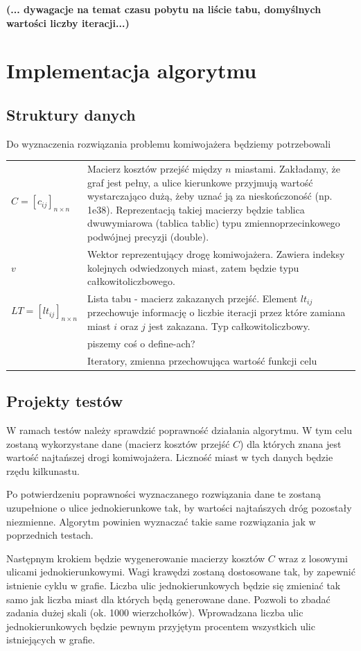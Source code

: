 \documentclass[11pt,a4paper,twoside]{article}
\begin{document}
\textbf{(... dywagacje na temat czasu pobytu na liście tabu, domyślnych wartości liczby iteracji...)}

\section{Implementacja algorytmu}

\subsection{Struktury danych}
Do wyznaczenia rozwiązania problemu komiwojażera będziemy potrzebowali
\bgroup
\def\arraystretch{1.5}
\begin{tabularx}{\textwidth}{l|X}
$C = [c_{ij}]_{n\times n}$ & Macierz kosztów przejść między $n$ miastami. Zakładamy, że graf jest pełny, a ulice kierunkowe przyjmują wartość wystarczająco dużą, żeby uznać ją za nieskończoność (np. 1e38). Reprezentacją takiej macierzy będzie tablica dwuwymiarowa (tablica tablic) typu zmiennoprzecinkowego podwójnej precyzji (double).\\
$v$ & Wektor reprezentujący drogę komiwojażera. Zawiera indeksy kolejnych odwiedzonych miast, zatem będzie typu całkowitoliczbowego. \\
$LT = [lt_{ij}]_{n\times n}$ & Lista tabu - macierz zakazanych przejść. Element $lt_{ij}$ przechowuje informację o liczbie iteracji przez które zamiana miast $i$ oraz $j$ jest zakazana. Typ całkowitoliczbowy.\\
 & piszemy coś o define-ach?\\
 & Iteratory, zmienna przechowująca wartość funkcji celu\\
\end{tabularx}
\egroup
\subsection{Projekty testów}
W ramach testów należy sprawdzić poprawność działania algorytmu. W tym celu zostaną wykorzystane dane (macierz kosztów przejść $C$) dla których znana jest wartość najtańszej drogi komiwojażera. Liczność miast w tych danych będzie rzędu kilkunastu.

Po potwierdzeniu poprawności wyznaczanego rozwiązania dane te zostaną uzupełnione o ulice jednokierunkowe tak, by wartości najtańszych dróg pozostały niezmienne. Algorytm powinien wyznaczać takie same rozwiązania jak w poprzednich testach.

Następnym krokiem będzie wygenerowanie macierzy kosztów $C$ wraz z losowymi ulicami jednokierunkowymi. Wagi krawędzi zostaną dostosowane tak, by zapewnić istnienie cyklu w grafie. Liczba ulic jednokierunkowych będzie się zmieniać tak samo jak liczba miast dla których będą generowane dane. Pozwoli to zbadać zadania dużej skali (ok. 1000 wierzchołków). Wprowadzana liczba ulic jednokierunkowych będzie pewnym przyjętym procentem wszystkich ulic istniejących w grafie.
\end{document}
